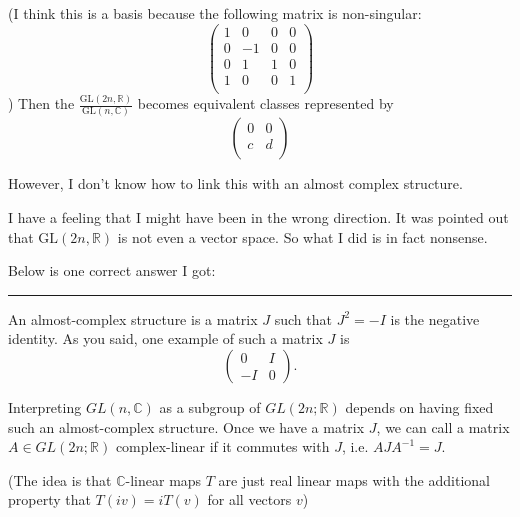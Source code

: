 \documentclass{article}
\numberwithin{equation}{subsection} %
\theoremstyle{definition}
\begin{document}
        (I think this is a basis because the following matrix is 
        non-singular:
        $$
        \left(
        \begin{array}{cccc}
         1 & 0 & 0 & 0 \\
         0 & -1 & 0 & 0 \\
         0 & 1 & 1 & 0 \\
         1 & 0 & 0 & 1 \\
        \end{array}
        \right)
        $$)
        Then the $\frac{\mathrm{GL}(2n,\mathbb{R})}{\mathrm{GL}
        (n,\mathbb{C})}$ becomes equivalent classes represented by 
        $$
        \left(
        \begin{array}{cc}
         0 & 0 \\
         c & d \\
        \end{array}
        \right)
        $$

        However, I don't know how to link this with an almost complex 
        structure.  

        I have a feeling that I might have been in the wrong direction. 
        It was pointed out that $\mathrm{GL}(2n,\mathbb{R})$ is not
        even a vector space. So what I did is in fact nonsense.
        
        Below is one correct answer I got:

        \begin{center}\noindent\rule{8cm}{0.4pt}\end{center}
        
        An almost-complex structure is a matrix $J$ such that $J^2 = -I$
        is the negative identity. As you said, one example of such a 
        matrix $J$ is $$\begin{pmatrix} 0 & I \\ -I & 0 \end{pmatrix}.$$

        Interpreting $GL(n,\mathbb{C})$ as a subgroup of 
        $GL(2n;\mathbb{R})$ depends on having fixed such an 
        almost-complex structure. Once we have a matrix $J$, we can call 
        a matrix $A \in GL(2n;\mathbb{R})$ complex-linear if it commutes 
        with $J$, i.e. $AJA^{-1} = J.$

        (The idea is that $\mathbb{C}$-linear maps $T$ are just real 
        linear maps with the additional property that $T(iv) = i T(v)$
        for all vectors $v$)
\end{document}
